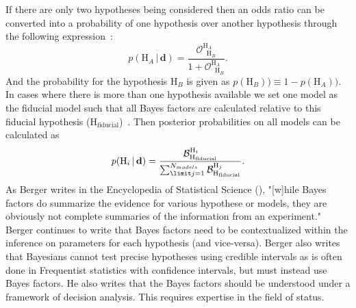 If there are only two hypotheses being considered then an odds ratio can be converted into a probability of one hypothesis over another hypothesis through the following expression~\cite{read2006encyclopedia}:
\begin{equation}\label{eqn:probability_odds_ratio}
    p(\mathrm{H}_A \, | \, \mathbf{d}) = \frac{\mathcal{O}^{\mathrm{H}_A\;\;}_{\;\;\mathrm{H}_B}}{1 + \mathcal{O}^{\mathrm{H}_A\;\;}_{\;\;\mathrm{H}_B}}.
\end{equation}
And the probability for the hypothesis $\mathrm{H}_B$ is given as $p(\mathrm{H}_B)) \equiv 1 - p(\mathrm{H}_A))$. In cases where there is more than one hypothesis available we set one model as the fiducial model such that all Bayes factors are calculated relative to this fiducial hypothesis ($\mathrm{H}_{\mathrm{fiducial}}$)~\cite{read2006encyclopedia}. Then posterior probabilities on all models can be calculated as
\begin{equation}
    p(\mathrm{H}_i \, | \, \mathbf{d}) = \frac{\mathcal{B}^{\mathrm{H}_i}_{\mathrm{H}_{\mathrm{fiducial}}}}
                                              {\sum^{N_{models}}_{\limit j=1} \mathcal{B}^{\mathrm{H}_j}_{\mathrm{H}_{\mathrm{fiducial}}}} .
\end{equation}
As Berger writes in the Encyclopedia of Statistical Science (\cite{read2006encyclopedia}), "[w]hile Bayes factors do summarize the evidence for various hypothese or models, they are obviously not complete summaries of the information from an experiment." Berger continues to write that Bayes factors need to be contextualized within the inference on parameters for each hypothesis (and vice-versa). Berger also writes that Bayesians cannot test precise hypotheses using credible intervals as is often done in Frequentist statistics with confidence intervals, but must instead use Bayes factors. He also writes that the Bayes factors should be understood under a framework of decision analysis. This requires expertise in the field of status.

